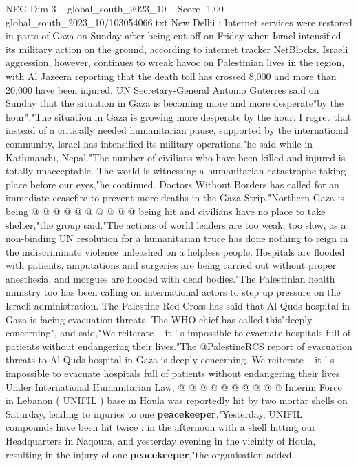 \begin{textsample}{NEG Dim 3 – global\_south\_2023\_10 – Score -1.00 – global\_south\_2023\_10/103054066.txt}  \label{ex:f3_neg_022}
New Delhi : Internet services were restored in parts of Gaza on Sunday after being cut off on Friday when Israel intensified its military action on the ground, according to internet tracker NetBlocks.
Israeli aggression, however, continues to wreak havoc on Palestinian lives in the region, with Al Jazeera reporting that the death toll has crossed 8,000 and more than 20,000 have been injured.
UN Secretary-General Antonio Guterres said on Sunday that the situation in Gaza is becoming more and more desperate"by the hour"."The situation in Gaza is growing more desperate by the hour.
I regret that instead of a critically needed humanitarian pause, supported by the international community, Israel has intensified its military operations,"he said while in Kathmandu, Nepal."The number of civilians who have been killed and injured is totally unacceptable.
The world is witnessing a humanitarian catastrophe taking place before our eyes,"he continued.
Doctors Without Borders has called for an immediate ceasefire to prevent more deaths in the Gaza Strip."Northern Gaza is being @ @ @ @ @ @ @ @ @ @ being hit and civilians have no place to take shelter,"the group said."The actions of world leaders are too weak, too slow, as a non-binding UN resolution for a humanitarian truce has done nothing to reign in the indiscriminate violence unleashed on a helpless people.
Hospitals are flooded with patients, amputations and surgeries are being carried out without proper anesthesia, and morgues are flooded with dead bodies."The Palestinian health ministry too has been calling on international actors to step up pressure on the Israeli administration.
The Palestine Red Cross has said that Al-Quds hospital in Gaza is facing evacuation threats.
The WHO chief has called this"deeply concerning", and said,"We reiterate -- it ' s impossible to evacuate hospitals full of patients without endangering their lives."The @PalestineRCS report of evacuation threats to Al-Quds hospital in Gaza is deeply concerning.
We reiterate -- it ' s impossible to evacuate hospitals full of patients without endangering their lives.
Under International Humanitarian Law, @ @ @ @ @ @ @ @ @ @ Interim Force in Lebanon ( UNIFIL ) base in Houla was reportedly hit by two mortar shells on Saturday, leading to injuries to one \textbf{peacekeeper}."Yesterday, UNIFIL compounds have been hit twice : in the afternoon with a shell hitting our Headquarters in Naqoura, and yesterday evening in the vicinity of Houla, resulting in the injury of one \textbf{peacekeeper},"the organisation added.

\end{textsample}

